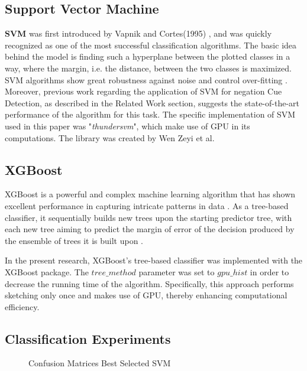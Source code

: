 \subsection{Support Vector Machine} 
\textbf{SVM} was first introduced by Vapnik and Cortes(1995) \cite{vapnik1995}, and was quickly recognized as one of the most successful classification algorithms. The basic idea behind the model is finding such a hyperplane between the plotted classes in a way, where the margin, i.e. the distance, between the two classes is maximized. SVM algorithms show great robustness against noise and control over-fitting \cite{robust2009}. Moreover, previous work regarding the application of SVM for negation Cue Detection, as described in the Related Work section, suggests the state-of-the-art performance of the algorithm for this task. The specific implementation of SVM used in this paper was  "\textit{thundersvm}", which make use of GPU in its computations. The library was created by Wen Zeyi et al. \cite{thundersvm}


\subsection{XGBoost}
XGBoost is a powerful and complex machine learning algorithm that has shown excellent performance in capturing intricate patterns in data \cite{minasny2009elements}. As a tree-based classifier, it sequentially builds new trees upon the starting predictor tree, with each new tree aiming to predict the margin of error of the decision produced by the ensemble of trees it is built upon \cite{minasny2009elements}.

In the present research, XGBoost's tree-based classifier was implemented with the XGBoost package. The $tree\_method$ parameter was set to $gpu\_hist$ in order to decrease the running time of the algorithm. Specifically, this approach performs sketching only once and makes use of GPU, thereby enhancing computational efficiency.

\FloatBarrier
\subsection{Classification Experiments}

\begin{figure}[!h]
\centering
  \caption{Confusion Matrices Best Selected SVM}
  \label{fig:base_best_svm}
\end{figure}


